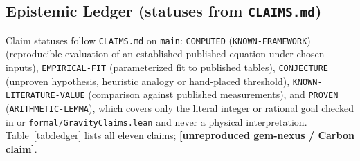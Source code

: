 \documentclass[11pt,letterpaper]{article}
\newcommand{\unrepro}{\textbf{\textcolor{red!60!black}{[unreproduced gem-nexus / Carbon claim]}}}
\begin{document}
\subsection*{Epistemic Ledger (statuses from \texttt{CLAIMS.md})}

Claim statuses follow \texttt{CLAIMS.md} on \texttt{main}: \texttt{COMPUTED} (\texttt{KNOWN-FRAMEWORK}) (reproducible evaluation of an established published equation under chosen inputs), \texttt{EMPIRICAL-FIT} (parameterized fit to published tables), \texttt{CONJECTURE} (unproven hypothesis, heuristic analogy or hand-placed threshold), \texttt{KNOWN-LITERATURE-VALUE} (comparison against published measurements), and \texttt{PROVEN} (\texttt{ARITHMETIC-LEMMA}), which covers only the literal integer or rational goal checked in  or \texttt{formal/GravityClaims.lean} and never a physical interpretation. Table~\ref{tab:ledger} lists all eleven claims; \unrepro.
\end{document}
